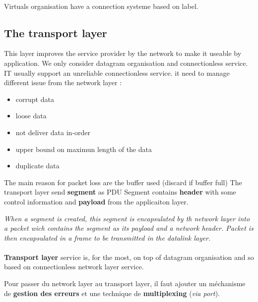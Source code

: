 \paragraph{ }Virtuals organisation have a connection systeme based on label.

%
% 
%
\subsection{The transport layer}
This layer improves the service provider by the network to make it useable by application. We only consider
datagram organisation and connectionless service.  IT usually support an unreliable connectionless service.
it need to manage different issue from the network layer :
\begin{multicols}{2}
\begin{itemize}
    \item corrupt data
    \item loose data
    \item not deliver data in-order
    \item upper bound on maximun length of the data
    \item duplicate data
\end{itemize}
\end{multicols}
The main reason for packet loss are the buffer used (discard if buffer full)
The transport layer send \textbf{segment} as PDU
Segment contains \textbf{header} with some control information and
\textbf{payload} from the applicaiton layer.

\begin{center}
    \textit{When a segment is created, this segment is encapsulated by th network layer
    into a packet wich contains the segment as its payload and a network header.
    Packet is then encapsulated in a frame to be transmitted in the datalink layer.}
\end{center}

\paragraph{ }
\textbf{Transport layer} service is, for the most, on top of datagram organisation and so based on connectionless network layer service.

Pour passer du network layer au transport layer, il faut ajouter un méchanisme de
\textbf{gestion des erreurs} et une technique de \textbf{multiplexing} (\textit{via port}).


